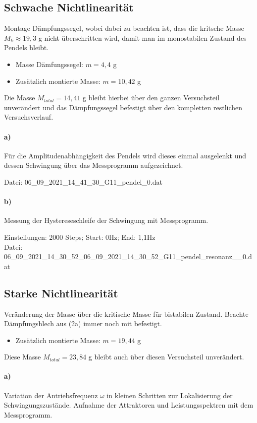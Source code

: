 \subsection{Schwache Nichtlinearität}
\label{sub:weakLin}
Montage Dämpfungssegel, wobei dabei zu beachten ist, dass die kritsche Masse $M_k\approx19,3$ g nicht überschritten wird, damit man im monostabilen Zustand des Pendels bleibt.
\begin{itemize}
    \item Masse Dämfungssegel: $m=4,4$ g
    \item Zusätzlich montierte Masse: $m = 10,42$ g
\end{itemize}
Die Masse $M_{total}= 14,41$ g bleibt hierbei über den ganzen Versuchsteil unverändert und das Dämpfungssegel befestigt über den kompletten restlichen Versuchsverlauf.
\paragraph{a)}
Für die Amplitudenabhängigkeit des Pendels wird dieses einmal ausgelenkt und dessen Schwingung über das Messprogramm aufgezeichnet.

Datei: 06\_09\_2021\_14\_41\_30\_G11\_pendel\_0.dat

\paragraph{b)}
Messung der Hystereseschleife der Schwingung mit Messprogramm.

Einstellungen: 2000 Steps; Start: 0Hz; End: 1,1Hz\\
Datei: 06\_09\_2021\_14\_30\_52\_06\_09\_2021\_14\_30\_52\_G11\_pendel\_resonanz\_\_0.dat\\

\subsection{Starke Nichtlinearität}
\label{sub:strongLin}
Veränderung der Masse über die kritische Masse für bistabilen Zustand. Beachte Dämpfungsblech aus (2a) immer noch mit befestigt.
\begin{itemize}
    \item Zusätzlich montierte Masse: $m = 19,44$ g
\end{itemize}
Diese Masse $M_{total}=23,84$ g bleibt auch über diesen Versuchsteil unverändert.

\paragraph{a)}
Variation der Antriebsfrequenz $\omega$ in kleinen Schritten zur Lokalisierung der Schwingungszustände. Aufnahme der Attraktoren und Leistungsspektren mit dem Messprogramm.

